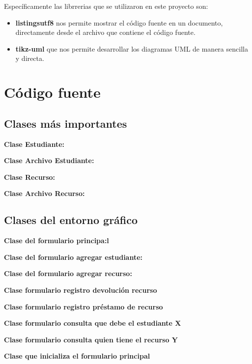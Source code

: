 \documentclass[12pt]{article}
\begin{document}
Específicamente las librrerias que se utilizaron en este proyecto son: 

\begin{itemize}
\item  \textbf{listingsutf8} nos permite mostrar el código fuente en un documento, directamente desde el archivo que contiene el código fuente.  
\item \textbf{tikz-uml} que nos permite desarrollar los diagramas UML de manera sencilla y directa.
\end{itemize}

\newpage
\section{Código fuente}
\subsection{Clases más importantes}
\textbf{Clase Estudiante: }

\textbf{Clase Archivo Estudiante: }

\textbf{Clase Recurso: }

\textbf{Clase Archivo Recurso: }

\subsection{Clases del entorno gráfico}
\textbf{Clase del formulario principa:l}

\textbf{Clase del formulario agregar estudiante: }

\textbf{Clase del formulario agregar recurso: }

\textbf{Clase formulario registro devolución recurso}

\textbf{Clase formulario registro préstamo de recurso}

\textbf{Clase formulario consulta que debe el estudiante X}

\textbf{Clase formulario consulta quien tiene el recurso Y}

\textbf{Clase que inicializa el formulario principal}

\newpage
\end{document}
